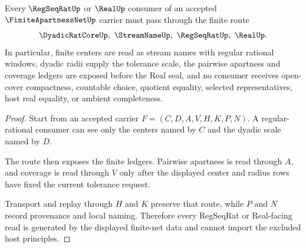 \begin{theorem}
\label{thm:finite-apartness-net-regseqrat-consumer}
Every $\RegSeqRatUp$ or $\RealUp$ consumer of an accepted $\FiniteApartnessNetUp$ carrier must pass through the finite route
$$
\DyadicRatCoreUp,\ \StreamNameUp,\ \RegSeqRatUp,\ \RealUp .
$$
In particular, finite centers are read as stream names with regular rational windows, dyadic radii supply the tolerance scale, the pairwise apartness and coverage ledgers are exposed before the Real seal, and no consumer receives open-cover compactness, countable choice, quotient equality, selected representatives, host real equality, or ambient completeness.
\end{theorem}
\begin{proof}
Start from an accepted carrier $F=(C,D,A,V,H,K,P,N)$. A regular-rational consumer can see only the centers named by $C$ and the dyadic scale named by $D$.

The route then exposes the finite ledgers. Pairwise apartness is read through $A$, and coverage is read through $V$ only after the displayed center and radius rows have fixed the current tolerance request.

Transport and replay through $H$ and $K$ preserve that route, while $P$ and $N$ record provenance and local naming. Therefore every RegSeqRat or Real-facing read is generated by the displayed finite-net data and cannot import the excluded host principles.
\end{proof}


\begin{closurestatus}{\FiniteApartnessNetUp}
  \theoryclosure{\seedClosure}
  \formalstatus{\unformalizedV}
\end{closurestatus}

